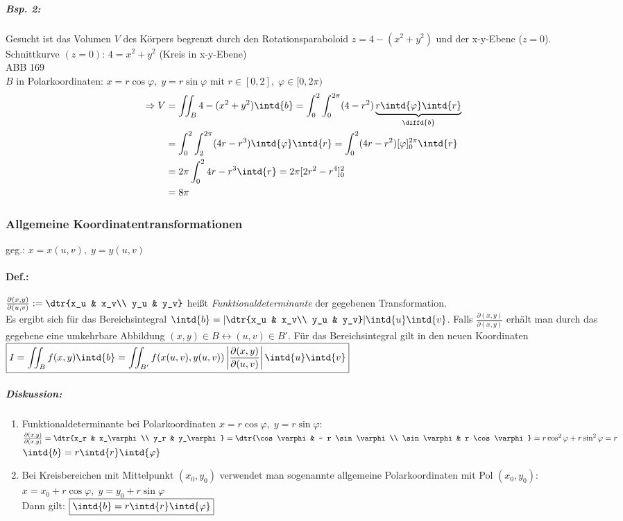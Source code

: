 \subparagraph{Bsp. 2:} Gesucht ist das Volumen $V$ des Körpers begrenzt durch den Rotationsparaboloid $z=4-(x^2+y^2)$ und der x-y-Ebene ($z=0$).\\
Schnittkurve $(z=0)$: $4=x^2+y^2$ (Kreis in x-y-Ebene)\\
ABB 169\\
$B$ in Polarkoordinaten: $x=r\cos \varphi, \; y=r\sin\varphi$ mit $r\in[0,2], \; \varphi \in [0,2\pi)$
\begin{align*}
\Rightarrow V &= \iint_B 4-(x^2+y^2)\intd{b}= \int_0^2 \int_0^{2\pi} (4-r^2)\underbrace{r \intd{\varphi} \intd{r}}_{\diffd{b}}\\
&= \int_0^2 \int_2^{2\pi} (4r-r^3) \intd{\varphi}\intd{r}=\int_0^2(4r-r^2)[\varphi]_0^{2\pi} \intd{r}\\
&= 2\pi \int_0^2 4r-r^3\intd{r}=2\pi [2r^2-r^4]_0^2\\
&= 8 \pi
\end{align*}
\subsubsection{Allgemeine Koordinatentransformationen}
geg.: $\boxed{x=x(u,v) ,\; y=y(u,v)}$
\paragraph{Def.:} $\frac{\partial (x,y)}{\partial (u,v)} := \dtr{x_u & x_v\\ y_u & y_v}$ heißt \emph{Funktionaldeterminante} der gegebenen Transformation.\\
Es ergibt sich für das Bereichsintegral $\intd{b}=|\dtr{x_u & x_v\\ y_u & y_v}| \intd{u} \intd{v}$. Falls $\frac{\partial (x,y)}{\partial (x,y)}$ erhält man durch das gegebene eine umkehrbare Abbildung $(x,y) \in B \leftrightarrow (u,v) \in B'$. Für das Bereichsintegral gilt in den neuen Koordinaten $\boxed{I=\iint_B f(x,y) \intd{b}= \iint_{B'}f(x(u,v), y(u,v)) \left| \frac{\partial (x,y)}{\partial (u,v)}\right| \intd{u}\intd{v}}$

\subparagraph{Diskussion:}
\begin{enumerate}
\item Funktionaldeterminante bei Polarkoordinaten $x=r\cos \varphi, \; y=r\sin \varphi$:\\
$\frac{\partial (x,y)}{\partial (x,y)}=\dtr{x_r & x_\varphi \\ y_r & y_\varphi}=\dtr{\cos \varphi & - r \sin \varphi \\ \sin \varphi & r \cos \varphi} = r \cos ^2\varphi + r \sin^2 \varphi = r$\\
$\intd{b}=r\intd{r}\intd{\varphi}$
\item Bei Kreisbereichen mit Mittelpunkt $(x_0,y_0)$ verwendet man sogenannte allgemeine Polarkoordinaten mit Pol $(x_0,y_0)$: $x=x_0+r\cos \varphi,\; y=y_0+r\sin\varphi$\\
Dann gilt: $\boxed{\intd{b}=r\intd{r}\intd{\varphi}}$
\end{enumerate}

